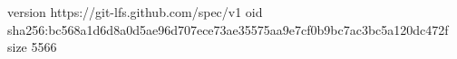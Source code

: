 version https://git-lfs.github.com/spec/v1
oid sha256:bc568a1d6d8a0d5ae96d707ece73ae35575aa9e7cf0b9bc7ac3bc5a120dc472f
size 5566
